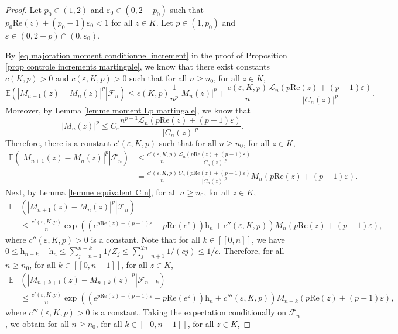 \documentclass[11pt]{article}
\numberwithin{equation}{section}
\def\vp{\varepsilon}
\def \cL{\mathcal{L}}
\def\E{\mathbb{E}}
\def\lb{[\![}
\def\rb{]\!]}
\renewcommand{\Re}{\mathrm{Re}}
\begin{document}
\begin{proof}
	Let $p_0 \in (1,2)$ and $\vp_0 \in (0, 2-p_0)$ such that $p_0 \Re(z)+ (p_0-1)\vp_0 <1$ for all $z \in K$. Let $p \in (1,p_0)$ and $\vp \in (0,2-p)\cap (0, \vp_0)$.
	
	By \eqref{eq majoration moment conditionnel increment} in the proof of Proposition \ref{prop controle increments martingale}, we know that there exist constants $c(K,p)>0$ and $c(\vp, K, p)>0$ such that for all $n\ge n_0$, for all $z \in K$,
	\[
	\E\left( \left. \left\vert M_{n+1}(z)-M_n(z) \right\vert^p  \right\vert \mathcal{F}_n\right)\le c(K,p) \frac{1}{n^p} \vert M_n(z) \vert^p + \frac{c(\vp, K, p)}{n} \frac{\cL_n(p\Re(z)+(p-1)\vp)}{\vert C_{n}(z)\vert^p}.
	\]
	Moreover, by Lemma \ref{lemme moment Lp martingale}, we know that
	\[
	\vert M_n(z)\vert^p\le C_\vp \frac{n^{p-1} \cL_n(p \Re(z)+(p-1)\vp)}{\vert C_n(z)\vert^p}.
	\]
	Therefore, there is a constant $c'(\vp, K, p)$ such that for all $n\ge n_0$, for all $z \in K$,
	\begin{align*}
	\E\left( \left. \left\vert M_{n+1}(z)-M_n(z) \right\vert^p  \right\vert \mathcal{F}_n\right)&\le \frac{c'(\vp, K, p)}{n} \frac{\cL_n(p\Re(z)+(p-1)\vp)}{\vert C_{n}(z)\vert^p} \\
	&= \frac{c'(\vp, K, p)}{n} \frac{C_n(p\Re(z)+(p-1)\vp)}{\vert C_n(z)\vert^p} M_n(p\Re(z)+(p-1)\vp).
	\end{align*}
	Next, by Lemma \ref{lemme equivalent C n}, for all $n\ge n_0$, for all $z \in K$,
	\begin{align*}
		\E&\left( \left. \left\vert M_{n+1}(z)-M_n(z) \right\vert^p  \right\vert \mathcal{F}_n\right)\\&\le 
	\frac{c'(\vp, K, p)}{n} \exp\left( \left(e^{p \Re(z) +(p-1)\vp}-p\Re(e^z)\right) \mathrm{h}_n +c''(\vp, K, p)\right)
	M_n(p\Re(z)+(p-1)\vp),
	\end{align*}
	where $c''(\vp, K, p)>0$ is a constant. Note that for all $k \in \lb 0, n \rb$, we have $0\le \mathrm{h}_{n+k} -\mathrm{h}_{n} \le \sum_{j=n+1}^{n+k} 1/Z_j \le \sum_{j=n+1}^{2n} 1/(cj)\le 1/c$. Therefore, for all $n\ge n_0$, for all $k \in \lb 0, n-1 \rb$, for all $z \in K$,
	\begin{align*}
		\E&\left( \left. \left\vert M_{n+k+1}(z)-M_{n+k}(z) \right\vert^p  \right\vert \mathcal{F}_{n+k}\right)\\&\le 
		\frac{c'(\vp, K, p)}{n} \exp\left( \left(e^{p \Re(z) +(p-1)\vp}-p\Re(e^z)\right) \mathrm{h}_n +c'''(\vp, K, p)\right)
		M_{n+k}(p\Re(z)+(p-1)\vp),
	\end{align*}
	where $c'''(\vp, K, p)>0$ is a constant. Taking the expectation conditionally on $\mathcal{F}_n$, we obtain for all $n\ge n_0$, for all $k \in \lb 0, n-1 \rb$, for all $z \in K$,

\end{proof}
\end{document}
